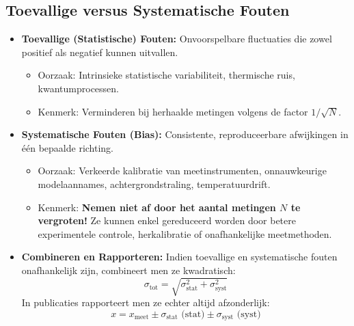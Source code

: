 \documentclass[11pt,a4paper]{article}
\begin{document}
\subsection{Toevallige versus Systematische Fouten}
\begin{itemize}[leftmargin=1.5em]
    \item \textbf{Toevallige (Statistische) Fouten:}
    Onvoorspelbare fluctuaties die zowel positief als negatief kunnen uitvallen.
    \begin{itemize}
        \item Oorzaak: Intrinsieke statistische variabiliteit, thermische ruis, kwantumprocessen.
        \item Kenmerk: Verminderen bij herhaalde metingen volgens de factor $1/\sqrt{N}$.
    \end{itemize}
    \item \textbf{Systematische Fouten (Bias):}
    Consistente, reproduceerbare afwijkingen in één bepaalde richting.
    \begin{itemize}
        \item Oorzaak: Verkeerde kalibratie van meetinstrumenten, onnauwkeurige modelaannames, achtergrondstraling, temperatuurdrift.
        \item Kenmerk: \textbf{Nemen niet af door het aantal metingen $N$ te vergroten!} Ze kunnen enkel gereduceerd worden door betere experimentele controle, herkalibratie of onafhankelijke meetmethoden.
    \end{itemize}
    \item \textbf{Combineren en Rapporteren:}
    Indien toevallige en systematische fouten onafhankelijk zijn, combineert men ze kwadratisch:
    \begin{equation}
        \sigma_{\text{tot}} = \sqrt{\sigma_{\text{stat}}^2 + \sigma_{\text{syst}}^2}
    \end{equation}
    In publicaties rapporteert men ze echter altijd afzonderlijk:
    \begin{equation}
        x = x_{\text{meet}} \pm \sigma_{\text{stat}} \text{ (stat)} \pm \sigma_{\text{syst}} \text{ (syst)}
    \end{equation}
\end{itemize}
\end{document}
